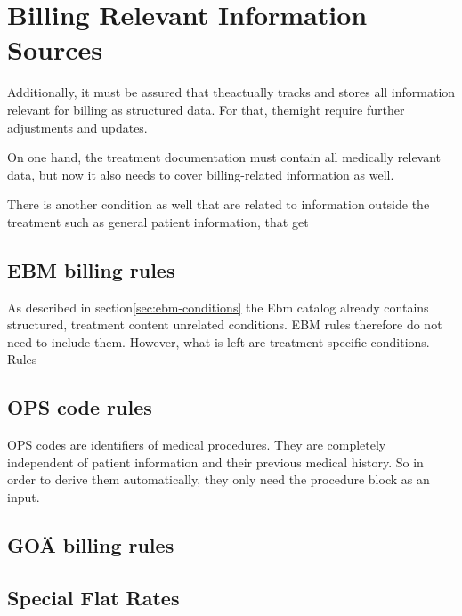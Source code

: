 \section{Billing Relevant Information Sources}\label{sec:billing-relevant-information-sources}



Additionally,
it must be assured that the\AVS actually tracks and stores all information relevant for billing as structured data.
For that, the\AVS might require further adjustments and updates.

On one hand, the treatment documentation must contain all medically relevant data,
but now it also needs to cover billing-related information as well.






There is another condition
as well that are related to information outside the treatment such as general patient information,
that get

\subsection{EBM billing rules}\label{subsec:ebm-billing-rules}
As described in section\ref{sec:ebm-conditions} the Ebm catalog already contains structured,
treatment content unrelated conditions.
EBM rules therefore do not need to include them.
However, what is left are treatment-specific conditions.
Rules

\subsection{OPS code rules}\label{subsec:ops-code-rules}
OPS codes are identifiers of medical procedures.
They are completely independent of patient information and their previous medical history.
So in order to derive them automatically, they only need the procedure block as an input.

\subsection{GOÄ billing rules}\label{subsec:goa-billing-rules}


\subsection{Special Flat Rates}\label{subsec:special-flat-rates}

